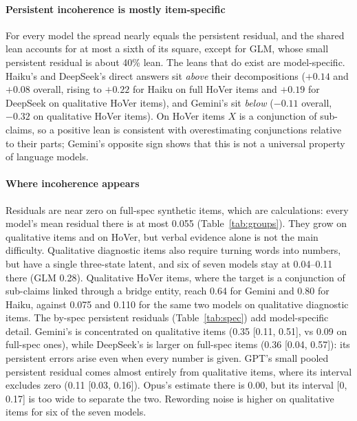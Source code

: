 \documentclass[11pt]{article}
\begin{document}
\paragraph{Persistent incoherence is mostly item-specific} For every model the spread nearly equals the persistent residual, and the shared lean accounts for at most a sixth of its square, except for GLM, whose small persistent residual is about 40\% lean. The leans that do exist are model-specific. Haiku's and DeepSeek's direct answers sit \emph{above} their decompositions ($+0.14$ and $+0.08$ overall, rising to $+0.22$ for Haiku on full HoVer items and $+0.19$ for DeepSeek on qualitative HoVer items), and Gemini's sit \emph{below} ($-0.11$ overall, $-0.32$ on qualitative HoVer items). On HoVer items $X$ is a conjunction of sub-claims, so a positive lean is consistent with overestimating conjunctions relative to their parts; Gemini's opposite sign shows that this is not a universal property of language models.

\paragraph{Where incoherence appears} Residuals are near zero on full-spec synthetic items, which are calculations: every model's mean residual there is at most 0.055 (Table~\ref{tab:groups}). They grow on qualitative items and on HoVer, but verbal evidence alone is not the main difficulty. Qualitative diagnostic items also require turning words into numbers, but have a single three-state latent, and six of seven models stay at 0.04--0.11 there (GLM 0.28). Qualitative HoVer items, where the target is a conjunction of sub-claims linked through a bridge entity, reach 0.64 for Gemini and 0.80 for Haiku, against 0.075 and 0.110 for the same two models on qualitative diagnostic items. The by-spec persistent residuals (Table~\ref{tab:spec}) add model-specific detail. Gemini's is concentrated on qualitative items (0.35 [0.11, 0.51], vs 0.09 on full-spec ones), while DeepSeek's is larger on full-spec items (0.36 [0.04, 0.57]): its persistent errors arise even when every number is given. GPT's small pooled persistent residual comes almost entirely from qualitative items, where its interval excludes zero (0.11 [0.03, 0.16]). Opus's estimate there is 0.00, but its interval [0, 0.17] is too wide to separate the two. Rewording noise is higher on qualitative items for six of the seven models.
\end{document}
